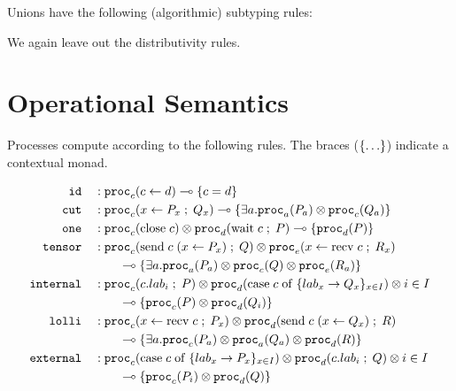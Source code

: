 \documentclass[11pt]{article}
\theoremstyle{plain}
\theoremstyle{definition}
\theoremstyle{remark}
\DeclarePairedDelimiter\parens{(}{)}             %
\DeclarePairedDelimiter\braces{\lbrace}{\rbrace} %
\newcommand\indexVar{x}
\newcommand\sub{\le}
\newcommand\lolli{\multimap}
\newcommand\lab{lab}
\newcommand\union{\mathbin{\sqcup}}
\newcommand\seq{\;;\;}
\newcommand\tbranches[2]{\braces{\lab_\indexVar \rightarrow {#1}_\indexVar}_{\indexVar \in #2}}
\newcommand\tfwd[2]{#1 \leftarrow #2}
\newcommand\tspawn[3]{#1 \leftarrow #2 \seq #3}
\newcommand\tclose[1]{\mathrm{close}\;#1}
\newcommand\twait[2]{\mathrm{wait}\;#1 \seq #2}
\newcommand\tsend[4]{\mathrm{send}\; #1 \; \parens{#2 \leftarrow #3} \seq #4}
\newcommand\trecv[3]{#1 \leftarrow \mathrm{recv} \; #2 \seq #3}
\newcommand\tcase[2]{\mathrm{case}\;#1\;\mathrm{of}\;#2}
\newcommand\tselect[3]{#1 . \lab_{#2} \seq #3}
\newcommand\monad[1]{\braces{#1}}
\newcommand\irb[1]{\texttt{#1}}
\newcommand\Right{\irb{R}}
\newcommand\Left{\irb{L}}
\newcommand\Sub[1]{\text{Sub-}#1}
\newcommand\proc[2]{\irb{proc}_{#1}\parens{#2}}
\begin{document}
Unions have the following (algorithmic) subtyping rules:

We again leave out the distributivity rules.


\section{Operational Semantics}

Processes compute according to the following rules. The braces ($\braces{\ldots}$) indicate a contextual monad.

\begin{align*}
  \irb{id}     \hspace{1em} & : \proc{c}{\tfwd{c}{d}} \lolli \monad{c = d} \\
  \irb{cut}    \hspace{1em} & : \proc{c}{\tspawn{x}{P_x}{Q_x}}
      \lolli \monad{\exists a. \proc{a}{P_a} \otimes \proc{c}{Q_a}} \\
  \irb{one} \hspace{1em} & : \proc{c}{\tclose{c}} \otimes \proc{d}{\twait{c}{P}}
    \lolli \monad{\proc{d}{P}} \\
  \irb{tensor} \hspace{1em} & : \proc{c}{\tsend{c}{x}{P_x}{Q}} \otimes \proc{e}{\trecv{x}{c}{R_x}} \\
    & \hspace{2em} \lolli \monad{ \exists a. \proc{a}{P_{a}} \otimes \proc{c}{Q} \otimes \proc{e}{R_{a}} } \\
  \irb{internal} \hspace{1em} & : \proc{c}{\tselect{c}{i}{P}} \otimes \proc{d}{\tcase{c}{\tbranches Q I}} \otimes i \in I \\
    & \hspace{2em} \lolli \monad{ \proc{c}{P} \otimes \proc{d}{Q_i} } \\
  \irb{lolli} \hspace{1em} & : \proc{c}{\trecv{x}{c}{P_x}} \otimes \proc{d}{\tsend{c}{x}{Q_x}{R}} \\
    & \hspace{2em} \lolli \monad{ \exists a. \proc{c}{P_{a}} \otimes \proc{a}{Q_a} \otimes \proc{d}{R} } \\
  \irb{external} \hspace{1em} & : \proc{c}{\tcase{c}{\tbranches P I}} \otimes \proc{d}{\tselect c i Q} \otimes i \in I \\
    & \hspace{2em} \lolli \monad{ \proc{c}{P_i} \otimes \proc{d}{Q} } \\
\end{align*}
\end{document}
